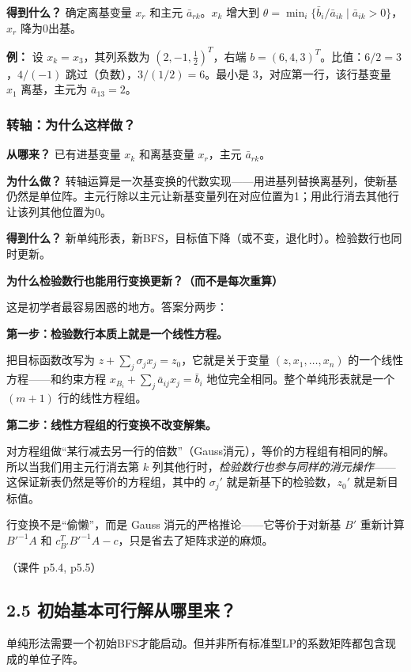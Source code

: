 \textbf{得到什么？} 确定离基变量 $x_r$ 和主元 $\bar{a}_{rk}$。$x_k$ 增大到 $\theta=\min_i\{\bar{b}_i/\bar{a}_{ik}\mid \bar{a}_{ik}>0\}$，$x_r$ 降为0出基。

\textbf{例：} 设 $x_k=x_3$，其列系数为 $(2, -1, \frac{1}{2})^T$，右端 $b=(6,4,3)^T$。比值：$6/2=3$，$4/(-1)$ 跳过（负数），$3/(1/2)=6$。最小是 $3$，对应第一行，该行基变量 $x_1$ 离基，主元为 $\bar{a}_{13}=2$。

\subsubsection{转轴：为什么这样做？}

\textbf{从哪来？} 已有进基变量 $x_k$ 和离基变量 $x_r$，主元 $\bar{a}_{rk}$。

\textbf{为什么做？} 转轴运算是一次基变换的代数实现——用进基列替换离基列，使新基仍然是单位阵。主元行除以主元让新基变量列在对应位置为1；用此行消去其他行让该列其他位置为0。

\textbf{得到什么？} 新单纯形表，新BFS，目标值下降（或不变，退化时）。检验数行也同时更新。

\textbf{为什么检验数行也能用行变换更新？（而不是每次重算）}

这是初学者最容易困惑的地方。答案分两步：

\textbf{第一步：检验数行本质上就是一个线性方程。}

把目标函数改写为 $z + \sum_{j}\sigma_j x_j = z_0$，它就是关于变量 $(z,x_1,\dots,x_n)$ 的一个线性方程——和约束方程 $x_{B_i} + \sum_j \bar{a}_{ij}x_j = \bar{b}_i$ 地位完全相同。整个单纯形表就是一个 $(m+1)$ 行的线性方程组。

\textbf{第二步：线性方程组的行变换不改变解集。}

对方程组做“某行减去另一行的倍数”（Gauss消元），等价的方程组有相同的解。所以当我们用主元行消去第 $k$ 列其他行时，\emph{检验数行也参与同样的消元操作}——这保证新表仍然是等价的方程组，其中的 $\sigma_j'$ 就是新基下的检验数，$z_0'$ 就是新目标值。

行变换不是“偷懒”，而是 Gauss 消元的严格推论——它等价于对新基 $B'$ 重新计算 $B'^{-1}A$ 和 $c_{B'}^T B'^{-1}A - c$，只是省去了矩阵求逆的麻烦。

（课件 p5.4, p5.5）

\subsection{2.5 初始基本可行解从哪里来？}

单纯形法需要一个初始BFS才能启动。但并非所有标准型LP的系数矩阵都包含现成的单位子阵。

